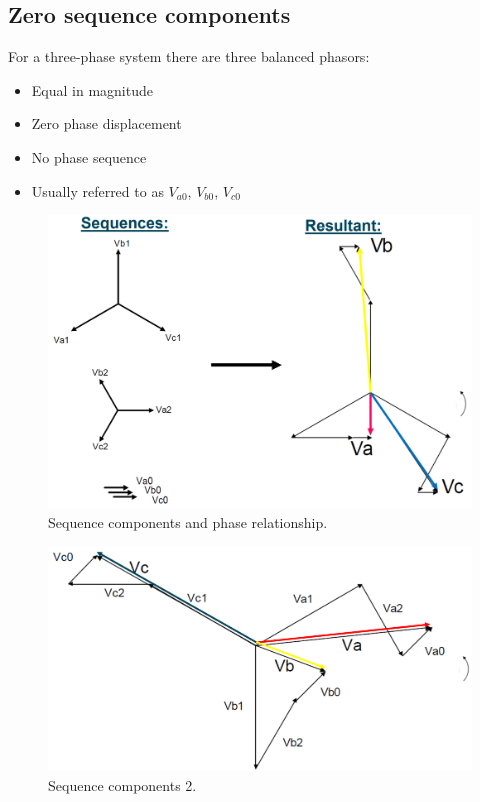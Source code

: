 \subsection{Zero sequence components}
For a three-phase system there are three balanced phasors:
\begin{itemize}
	\item Equal in magnitude
	\item Zero phase displacement
	\item No phase sequence
	\item Usually referred to as $V_{a0}$, $V_{b0}$, $V_{c0}$
\end{itemize}
\begin{figure}[H]
	\centering
	\includegraphics[width = \textwidth]{./img/figure22.png}
	\caption{Sequence components and phase relationship.}
\end{figure}
\begin{figure}[H]
	\centering
	\includegraphics[width = \textwidth]{./img/figure23.png}
	\caption{Sequence components 2.}
\end{figure}
